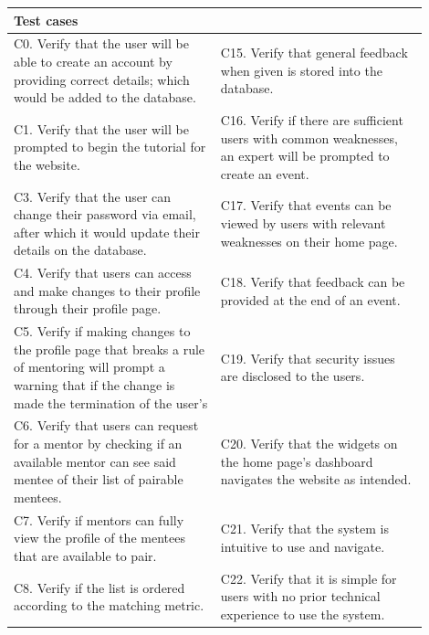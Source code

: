 \documentclass[10pt]{article}
\begin{document}
\begin{longtable}{|p{0.45\linewidth}||p{0.45\linewidth}|}
    \hline \textbf{Test cases} & \\ \hline\hline

    C0. Verify that the user will be able to create an account by providing correct details; which would be added to the database.
    &
    C15. Verify that general feedback when given is stored into the database.
    \\ \hline

    C1. Verify that the user will be prompted to begin the tutorial for the website.
    &
    C16. Verify if there are sufficient users with common weaknesses, an expert will be prompted to create an event.
    \\ \hline

    C3. Verify that the user can change their password via email, after which it would update their details on the database.
    &
    C17. Verify that events can be viewed by users with relevant weaknesses on their home page.
    \\ \hline

    C4. Verify that users can access and make changes to their profile through their profile page.
    &
    C18. Verify that feedback can be provided at the end of an event.
    \\ \hline

    C5. Verify if making changes to the profile page that breaks a rule of mentoring will prompt a warning that if the change is made the termination of the user's 
    &
    C19. Verify that security issues are disclosed to the users.
    \\ \hline

    C6. Verify that users can request for a mentor by checking if an available mentor can see said mentee of their list of pairable mentees.
    &
    C20. Verify that the widgets on the home page's dashboard navigates the website as intended.
    \\ \hline

    C7. Verify if mentors can fully view the profile of the mentees that are available to pair.
    &
    C21. Verify that the system is intuitive to use and navigate.
    \\ \hline

    C8. Verify if the list is ordered according to the matching metric.
    &
    C22. Verify that it is simple for users with no prior technical experience to use the system.
    \\ \hline


\end{longtable}
\end{document}
